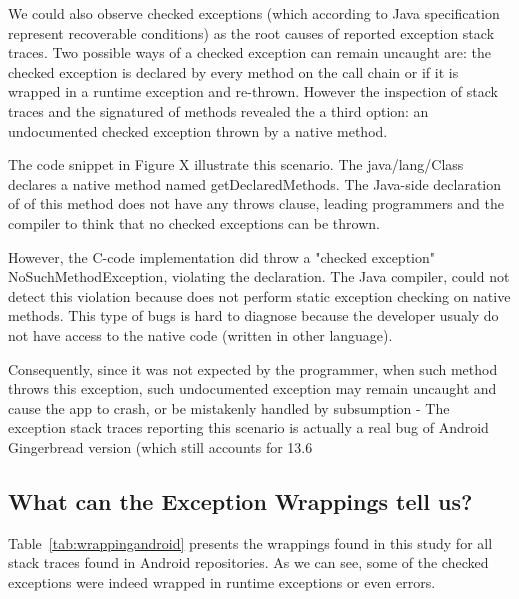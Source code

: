 \documentclass[conference]{IEEEtran}
\begin{document}
We could also observe checked exceptions (which according to Java specification represent
recoverable conditions) as the root causes of reported exception stack traces.
Two possible ways of a checked exception can remain uncaught are: the checked 
exception is declared by every method on the call chain or if it is wrapped in a 
runtime exception and re-thrown. However the inspection of stack traces 
and the signatured of methods revealed the a third option: an undocumented
checked exception thrown by a native method. 

The code snippet in Figure X illustrate this scenario.
 The java/lang/Class declares a native method named getDeclaredMethods. 
The Java-side declaration of of this method does not have any throws clause, 
leading programmers and the compiler to think that no checked exceptions can be thrown.

 However, the C-code implementation did throw a "checked exception" NoSuchMethodException, 
violating the declaration. The Java compiler, could not detect this violation because does 
not perform static exception  checking on native methods. This type of bugs is hard to diagnose
because the developer usualy do not have access to the native code (written in other language). 

Consequently, since it was not expected by the programmer, when such method throws 
this exception, such undocumented exception may remain
uncaught and cause the app to crash, or be mistakenly handled by subsumption - 
The exception stack traces reporting this scenario is actually a real bug of Android 
Gingerbread version (which still accounts for 13.6%


\noindent {}

\subsection{What can the Exception Wrappings tell us?}
Table~\ref{tab:wrappingandroid} presents the wrappings found in this study for all
stack traces found in Android repositories. As we can see, some of the checked
exceptions were indeed wrapped in runtime exceptions or even errors.
\end{document}
